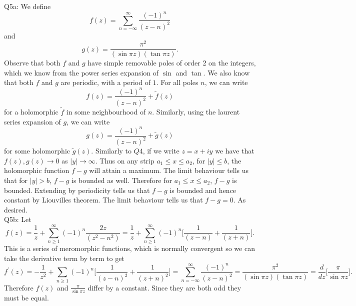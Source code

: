 \documentclass[letterpaper]{article}
\begin{document}
 \noindent  Q5a: 
We define $$f(z) = \sum_{n= -\infty}^\infty \frac{(-1)^n}{(z-n)^2}$$ and 
$$g(z) = \frac{\pi^2}{(\sin\pi z)(\tan \pi z)}.$$
Observe that both $f$ and $g$ have simple removable poles of order 2 on the integers, which we know from the power series expansion of 
$\sin$ and $\tan$. We also know that both $f$ and $g$ are periodic, with a period of $1$. For all poles 
$n$, we can write $$f(z) = \frac{(-1)^n}{(z-n)^2} + \tilde{f}(z)$$ for a holomorphic $\tilde{f}$ in some neighbourhood of $n$. 
Similarly, using the laurent series expansion of $g$, we can write $$g(z) = \frac{(-1)^n}{(z-n)^2} + \tilde{g}(z)$$ for some holomorphic $\tilde{g}(z)$. 
Similarly to $Q4$, if we write $z=x+iy$ we have that $f(z),g(z) \to 0 $ as $|y| \to \infty$. 
Thus on any strip $a_1 \leq x \leq a_2$, for $|y|\leq b$, the holomorphic function $f-g$ will attain a maximum. The limit behaviour tells us 
that for $|y|>b$, $f-g$ is bounded as well. Therefore for $a_1 \leq x \leq a_2$, $f-g$ is bounded. 
Extending by periodicity tells us that $f-g$ is bounded and hence constant by Liouvilles theorem. The limit behaviour tells us that $f-g=0$. As desired. 
\newline \\ Q5b: Let $$f(z) = \frac{1}{z} + \sum_{n\geq 1}^\infty (-1)^n \frac{2z}{(z^2-n^2)} = \frac{1}{z} + \sum_{n\geq 1}^\infty (-1)^n \Big[ \frac{1}{(z-n)} + \frac{1}{(z+n)} \Big].$$ 
This is a series of meromorphic functions, which is normally convergent so we can take the derivative term by term to get 
$$f^\prime(z) = -\frac{1}{z^2} + \sum_{n\geq 1} (-1)^n \Big[ \frac{1}{(z-n)^2}  + \frac{1}{(z+n)^2} \Big] =  \sum_{n= -\infty}^\infty \frac{(-1)^n}{(z-n)^2} = \frac{\pi^2}{(\sin\pi z)(\tan\pi z)} = \frac{d}{dz}\Big[ \frac{\pi}{\sin \pi z} \Big].$$
Therefore $f(z)$ and $\frac{\pi}{\sin \pi z}$ differ by a constant. Since they are both odd they must be equal. 
\end{document}
